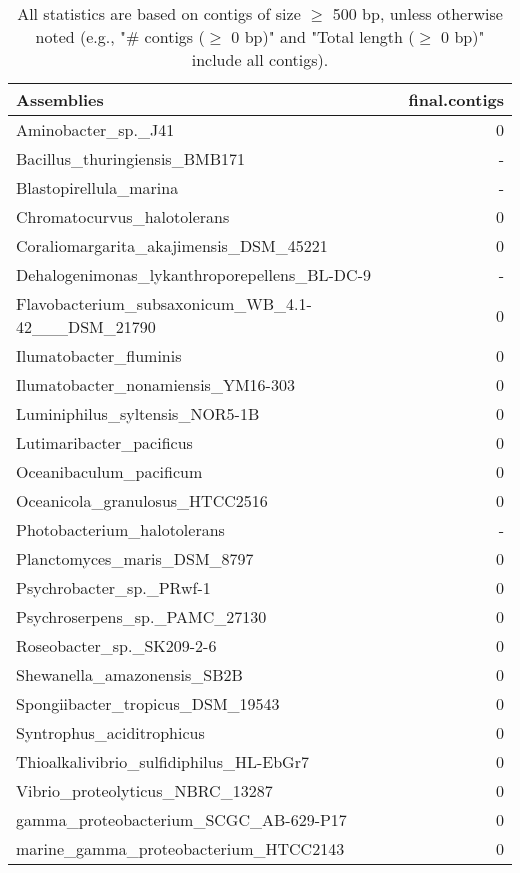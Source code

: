\documentclass[12pt,a4paper]{article}
\begin{document}
\begin{table}[ht]
\begin{center}
\caption{All statistics are based on contigs of size $\geq$ 500 bp, unless otherwise noted (e.g., "\# contigs ($\geq$ 0 bp)" and "Total length ($\geq$ 0 bp)" include all contigs).}
\begin{tabular}{|l*{1}{|r}|}
\hline
Assemblies & final.contigs \\ \hline
Aminobacter\_sp.\_J41 & 0 \\ \hline
Bacillus\_thuringiensis\_BMB171 & - \\ \hline
Blastopirellula\_marina & - \\ \hline
Chromatocurvus\_halotolerans & 0 \\ \hline
Coraliomargarita\_akajimensis\_DSM\_45221 & 0 \\ \hline
Dehalogenimonas\_lykanthroporepellens\_BL-DC-9 & - \\ \hline
Flavobacterium\_subsaxonicum\_WB\_4.1-42\_\_\_DSM\_21790 & 0 \\ \hline
Ilumatobacter\_fluminis & 0 \\ \hline
Ilumatobacter\_nonamiensis\_YM16-303 & 0 \\ \hline
Luminiphilus\_syltensis\_NOR5-1B & 0 \\ \hline
Lutimaribacter\_pacificus & 0 \\ \hline
Oceanibaculum\_pacificum & 0 \\ \hline
Oceanicola\_granulosus\_HTCC2516 & 0 \\ \hline
Photobacterium\_halotolerans & - \\ \hline
Planctomyces\_maris\_DSM\_8797 & 0 \\ \hline
Psychrobacter\_sp.\_PRwf-1 & 0 \\ \hline
Psychroserpens\_sp.\_PAMC\_27130 & 0 \\ \hline
Roseobacter\_sp.\_SK209-2-6 & 0 \\ \hline
Shewanella\_amazonensis\_SB2B & 0 \\ \hline
Spongiibacter\_tropicus\_DSM\_19543 & 0 \\ \hline
Syntrophus\_aciditrophicus & 0 \\ \hline
Thioalkalivibrio\_sulfidiphilus\_HL-EbGr7 & 0 \\ \hline
Vibrio\_proteolyticus\_NBRC\_13287 & 0 \\ \hline
gamma\_proteobacterium\_SCGC\_AB-629-P17 & 0 \\ \hline
marine\_gamma\_proteobacterium\_HTCC2143 & 0 \\ \hline
\end{tabular}
\end{center}
\end{table}
\end{document}
